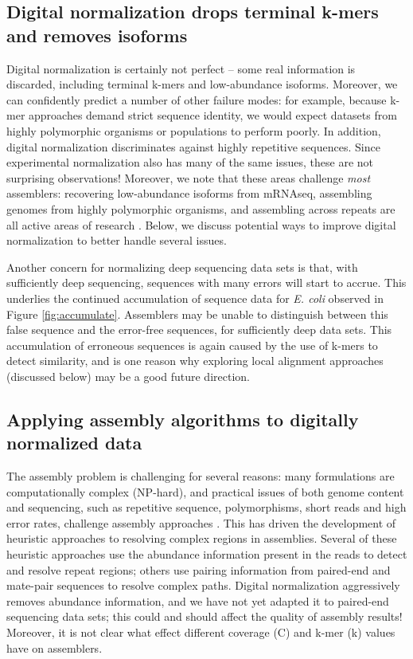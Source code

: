 \documentclass{pnastwo}
\begin{document}
\begin{article}

\subsection{Digital normalization drops terminal k-mers and removes isoforms}

Digital normalization is certainly not perfect -- some real
information is discarded, including terminal k-mers and low-abundance
isoforms.  Moreover, we can confidently predict a number of other
failure modes: for example, because k-mer approaches demand strict
sequence identity, we would expect datasets from highly polymorphic
organisms or populations to perform poorly.  In addition, digital
normalization discriminates against highly repetitive sequences. Since
experimental normalization also has many of the same issues, these are
not surprising observations!  Moreover, we note that these areas
challenge {\em most} assemblers: recovering low-abundance isoforms
from mRNAseq, assembling genomes from highly polymorphic organisms,
and assembling across repeats are all active areas of research
\cite{pubmed18549302,pubmed20633259,pubmed18541131}.  Below, we
discuss potential ways to improve digital normalization to better
handle several issues.

Another concern for normalizing deep sequencing data sets is that,
with sufficiently deep sequencing, sequences with many errors will
start to accrue.  This underlies the continued accumulation of
sequence data for {\em E. coli} observed in Figure
\ref{fig:accumulate}.  Assemblers may be unable to distinguish between
this false sequence and the error-free sequences, for sufficiently
deep data sets.  This accumulation of erroneous sequences is again
caused by the use of k-mers to detect similarity, and is one reason
why exploring local alignment approaches (discussed below) may be a
good future direction.

\subsection{Applying assembly algorithms to digitally normalized data}

The assembly problem is challenging for several reasons: many
formulations are computationally complex (NP-hard), and practical issues of both genome content
and sequencing, such as repetitive sequence, polymorphisms, short
reads and high error rates, challenge assembly approaches
\cite{pubmed19580519}.  This has driven the development of heuristic
approaches to resolving complex regions in assemblies.  Several of
these heuristic approaches use the abundance information present in
the reads to detect and resolve repeat regions; others use pairing
information from paired-end and mate-pair sequences to resolve complex
paths.  Digital normalization aggressively removes abundance
information, and we have not yet adapted it to paired-end sequencing
data sets; this could and should affect the quality of assembly
results! Moreover, it is not clear what effect different coverage (C)
and k-mer (k) values have on assemblers.


\end{article}
\end{document}

